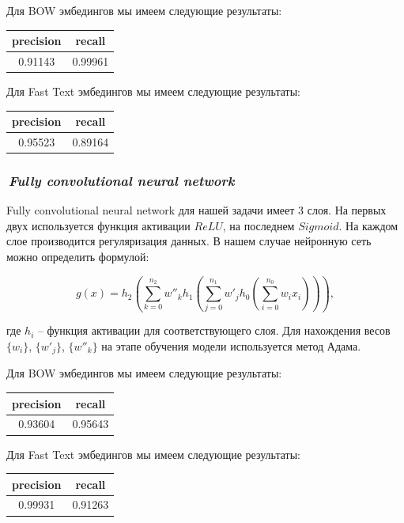 \documentclass[12pt]{article}
\begin{document}
Для BOW эмбедингов мы имеем следующие результаты:
\begin{center}
  \begin{tabular}{ | c | c |}
    \hline
     precision & recall \\ \hline
     0.91143 & 0.99961 \\ \hline
  \end{tabular}
\end{center}


Для Fast Text эмбедингов мы имеем следующие результаты:
\begin{center}
  \begin{tabular}{ | c | c |}
    \hline
     precision & recall \\ \hline
     0.95523 & 0.89164  \\ \hline
  \end{tabular}
\end{center}

\subsubsection*{\it\,Fully convolutional neural network}

Fully convolutional neural network для нашей задачи имеет 3 слоя. На первых двух используется функция активации $ReLU$, на последнем $Sigmoid$. На каждом слое производится регуляризация данных. В нашем случае нейронную сеть можно определить формулой:

$$
g(x) = h_2 \left(\sum_{k=0}^{n_2} w''_k h_1\left(\sum_{j=0}^{n_1} w'_j h_0\left( \sum_{i=0}^{n_0} w_i x_i \right)\right)\right),
$$

где $h_i$ -- функция активации для соответствующего слоя. Для нахождения весов $\{w_i\}$, $\{w'_j\}$, $\{w''_k\}$ на этапе обучения модели используется метод Адама.

Для BOW эмбедингов мы имеем следующие результаты:
\begin{center}
  \begin{tabular}{ | c | c |}
    \hline
     precision & recall \\ \hline
     0.93604 & 0.95643 \\ \hline
  \end{tabular}
\end{center}

Для Fast Text эмбедингов мы имеем следующие результаты:
\begin{center}
  \begin{tabular}{ | c | c |}
    \hline
     precision & recall \\ \hline
     0.99931 & 0.91263 \\ \hline
  \end{tabular}
\end{center}
\end{document}
